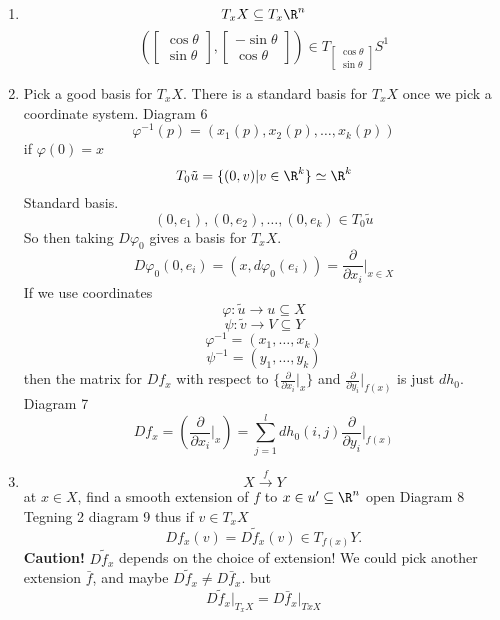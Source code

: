 \begin{remark}
  \begin{enumerate}
    \item $$T_xX \subseteq T_x\R^n$$
    $$
    \left(
    \begin{bmatrix}
      \cos \theta \\
      \sin\theta
    \end{bmatrix},
    \begin{bmatrix}
      -\sin \theta \\
      \cos \theta
    \end{bmatrix}
    \right)\in T_{\begin{bmatrix}
      \cos \theta \\
      \sin\theta
    \end{bmatrix}}S^1$$
    \item Pick a good basis for $T_xX$. There is a standard basis for $T_xX$ once we pick a coordinate system.
    \newline Diagram 6
    $$\varphi ^{-1} (p)=(x_1(p),x_2(p),\dots,x_k(p))$$
    if $\varphi (0)=x$
      $$T_0\tilde{u}=\{(0,v) | v\in \R^k\}\simeq \R^k$$
    Standard basis.
      $$(0,e_1),(0,e_2),\dots,(0,e_k) \in T_0\tilde{u}$$
    So then taking $D \varphi _0$ gives a basis for $T_xX$.
      $$D \varphi _0(0,e_i)=\left(x,d \varphi _0(e_i)\right)=\frac{\partial }{\partial x_i}\rvert_{x\in X}$$
    If we use coordinates
      $$\varphi : \tilde{u}\to u \subseteq X$$
      $$\psi: \tilde{v}\to V \subseteq Y $$
      $$\varphi ^{-1}=(x_1,\dots,x_k)$$
      $$\psi ^{-1}=(y_1,\dots,y_k)$$
    then the matrix for $Df_x$ with respect to $\{\frac{\partial }{\partial x_i}\rvert_{x}\}$ and $\frac{\partial }{\partial y_i}\rvert_{f(x)}$ is just $dh_0$.
    \newline Diagram 7
    $$Df_x= \left(\frac{\partial }{\partial x_i}\rvert_{x}\right)=\sum_{j=1}^l dh_0(i,j)\frac{\partial }{\partial y_i}\rvert_{f(x)}$$
    \item
    $$X\xrightarrow{f}Y$$
    at $x\in X$, find a smooth extension of $f$ to $x\in u' \subseteq \R^n$ open
    \newline Diagram 8
    \newline Tegning 2
    \newline diagram 9
    \newline thus if $v\in T_xX$
      $$Df_x(v)=D\tilde{f}_x(v)\in T_{f(x)}Y.$$
    \textbf{Caution!} $D\tilde{f}_x$ depends on the choice of extension! We could pick another extension $\bar{f}$, and maybe $D\tilde{f}_x\neq D\bar{f}_x$. but
      $$D\tilde{f}_x\rvert_{T_xX}=D\bar{f}_x\rvert_{TxX}$$

\end{enumerate}
\end{remark}
